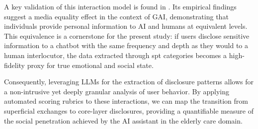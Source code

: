 A key validation of this interaction model is found in  \cite{Merwin2025}. Its empirical findings suggest a media equality effect in the context of GAI, demonstrating that individuals provide personal information to AI and humans at equivalent levels. This equivalence is a cornerstone for the present study: if users disclose sensitive information to a chatbot with the same frequency and depth as they would to a human interlocutor, the data extracted through \gls{spt} categories becomes a high-fidelity proxy for true emotional and social state.

Consequently, leveraging LLMs for the extraction of  disclosure patterns allows for a non-intrusive yet deeply granular analysis of user behavior. By applying automated scoring rubrics to these interactions, we can map the transition from superficial exchanges to core-layer disclosures, providing a quantifiable measure of the social penetration achieved by the AI assistant in the elderly care domain.







    

